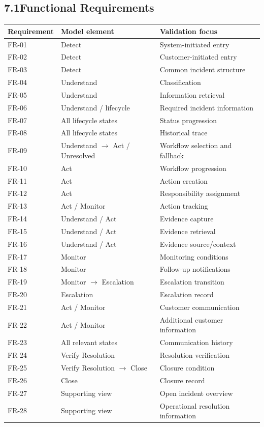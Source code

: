 \documentclass[11pt,a4paper]{article}
\begin{document}
\subsection*{7.1\enspace Functional Requirements}

\begin{center}
\small
\begin{tabularx}{\textwidth}{@{} l l X @{}}
\toprule
\textbf{Requirement} & \textbf{Model element} & \textbf{Validation focus} \\
\midrule
FR-01 & Detect & System-initiated entry \\
FR-02 & Detect & Customer-initiated entry \\
FR-03 & Detect & Common incident structure \\
FR-04 & Understand & Classification \\
FR-05 & Understand & Information retrieval \\
FR-06 & Understand / lifecycle & Required incident information \\
FR-07 & All lifecycle states & Status progression \\
FR-08 & All lifecycle states & Historical trace \\
FR-09 & Understand $\rightarrow$ Act / Unresolved & Workflow selection and fallback \\
FR-10 & Act & Workflow progression \\
FR-11 & Act & Action creation \\
FR-12 & Act & Responsibility assignment \\
FR-13 & Act / Monitor & Action tracking \\
FR-14 & Understand / Act & Evidence capture \\
FR-15 & Understand / Act & Evidence retrieval \\
FR-16 & Understand / Act & Evidence source/context \\
FR-17 & Monitor & Monitoring conditions \\
FR-18 & Monitor & Follow-up notifications \\
FR-19 & Monitor $\rightarrow$ Escalation & Escalation transition \\
FR-20 & Escalation & Escalation record \\
FR-21 & Act / Monitor & Customer communication \\
FR-22 & Act / Monitor & Additional customer information \\
FR-23 & All relevant states & Communication history \\
FR-24 & Verify Resolution & Resolution verification \\
FR-25 & Verify Resolution $\rightarrow$ Close & Closure condition \\
FR-26 & Close & Closure record \\
FR-27 & Supporting view & Open incident overview \\
FR-28 & Supporting view & Operational resolution information \\
\bottomrule
\end{tabularx}
\end{center}
\end{document}
